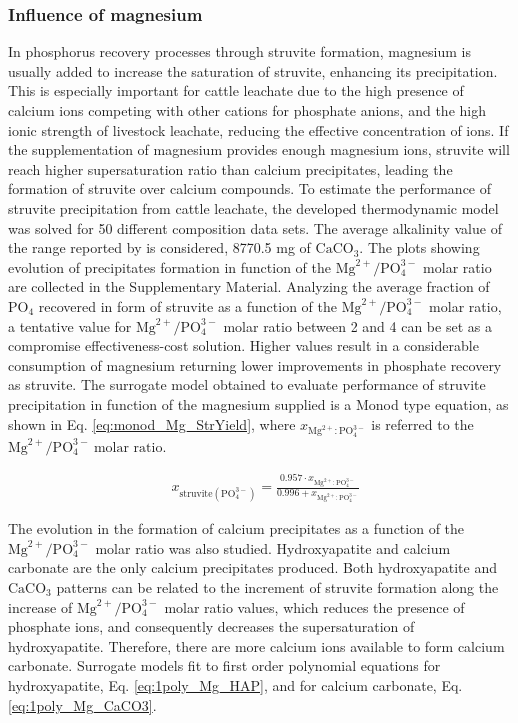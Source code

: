\begin{refsection}[referencesCh3]
\subsubsection{Influence of magnesium} \label{inf_Mg}
In phosphorus recovery processes through struvite formation, magnesium is usually added to increase the saturation of struvite, enhancing its precipitation. This is especially important for cattle leachate due to the high presence of calcium ions competing with other cations for phosphate anions, and the high ionic strength of livestock leachate, reducing the effective concentration of ions. If the supplementation of magnesium provides enough magnesium ions, struvite will reach higher supersaturation ratio than calcium precipitates, leading the formation of struvite over calcium compounds.
To estimate the performance of struvite precipitation from cattle leachate, the developed thermodynamic model was solved for 50 different composition data sets. The average alkalinity value of the range reported by \citet{Tao} is considered, 8770.5 mg of $\text{CaCO}_{3}$.
The plots showing evolution of precipitates formation in function of the  $\text{Mg}^{2+}/\text{PO}_{4}^{3-}$ molar ratio are collected in the Supplementary Material. 
Analyzing the average fraction of $\text{PO}_{4}$ recovered in form of struvite as a function of the $\text{Mg}^{2+}/\text{PO}_{4}^{3-}$ molar ratio, a tentative value for $\text{Mg}^{2+}/\text{PO}_{4}^{3-}$ molar ratio between 2 and 4 can be set as a compromise effectiveness-cost solution. Higher values result in a considerable consumption of magnesium returning lower improvements in phosphate recovery as struvite.
The surrogate model obtained to evaluate performance of struvite precipitation in function of the magnesium supplied is a Monod type equation, as shown in Eq. \ref{eq:monod_Mg_StrYield}, where $x_{\text{Mg}^{2+}:\text{PO}_{4}^{3-}}$ is referred to the $\text{Mg}^{2+}/\text{PO}_{4}^{3-} \ \text{molar ratio}$.

\begin{align}
& x_{\text{struvite} \left(\text{PO}_{4}^{3-}\right)} = \frac{0.957 \cdot x_{\text{Mg}^{2+}:\text{PO}_{4}^{3-}}}{0.996 + x_{\text{Mg}^{2+}:\text{PO}_{4}^{3-}}} \label{eq:monod_Mg_StrYield} 
\end{align}

The evolution in the formation of calcium precipitates as a function of the $\text{Mg}^{2+}/\text{PO}_{4}^{3-}$ molar ratio was also studied. Hydroxyapatite and calcium carbonate are the only calcium precipitates produced.
Both hydroxyapatite and $\text{CaCO}_{3}$ patterns can be related to the increment of struvite formation along the increase of $\text{Mg}^{2+}/\text{PO}_{4}^{3-}$ molar ratio values, which reduces the presence of phosphate ions, and consequently decreases the supersaturation of hydroxyapatite. Therefore, there are more calcium ions available to form calcium carbonate. 
Surrogate models fit to first order polynomial equations for hydroxyapatite, Eq. \ref{eq:1poly_Mg_HAP}, and for calcium carbonate, Eq. \ref{eq:1poly_Mg_CaCO3}.


\end{refsection}
